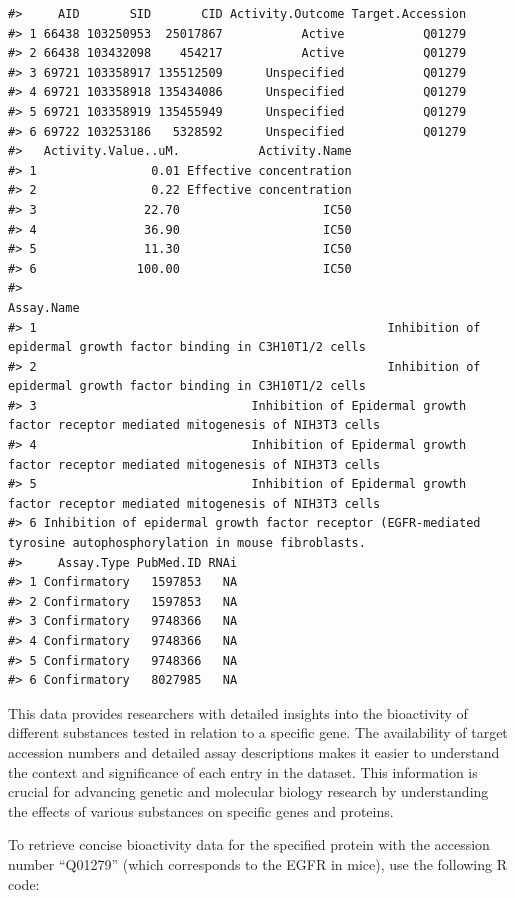 \begin{verbatim}
#>     AID       SID       CID Activity.Outcome Target.Accession
#> 1 66438 103250953  25017867           Active           Q01279
#> 2 66438 103432098    454217           Active           Q01279
#> 3 69721 103358917 135512509      Unspecified           Q01279
#> 4 69721 103358918 135434086      Unspecified           Q01279
#> 5 69721 103358919 135455949      Unspecified           Q01279
#> 6 69722 103253186   5328592      Unspecified           Q01279
#>   Activity.Value..uM.           Activity.Name
#> 1                0.01 Effective concentration
#> 2                0.22 Effective concentration
#> 3               22.70                    IC50
#> 4               36.90                    IC50
#> 5               11.30                    IC50
#> 6              100.00                    IC50
#>                                                                                                         Assay.Name
#> 1                                                 Inhibition of epidermal growth factor binding in C3H10T1/2 cells
#> 2                                                 Inhibition of epidermal growth factor binding in C3H10T1/2 cells
#> 3                              Inhibition of Epidermal growth factor receptor mediated mitogenesis of NIH3T3 cells
#> 4                              Inhibition of Epidermal growth factor receptor mediated mitogenesis of NIH3T3 cells
#> 5                              Inhibition of Epidermal growth factor receptor mediated mitogenesis of NIH3T3 cells
#> 6 Inhibition of epidermal growth factor receptor (EGFR-mediated tyrosine autophosphorylation in mouse fibroblasts.
#>     Assay.Type PubMed.ID RNAi
#> 1 Confirmatory   1597853   NA
#> 2 Confirmatory   1597853   NA
#> 3 Confirmatory   9748366   NA
#> 4 Confirmatory   9748366   NA
#> 5 Confirmatory   9748366   NA
#> 6 Confirmatory   8027985   NA
\end{verbatim}

This data provides researchers with detailed insights into the bioactivity of different substances tested in relation to a specific gene. The availability of target accession numbers and detailed assay descriptions makes it easier to understand the context and significance of each entry in the dataset. This information is crucial for advancing genetic and molecular biology research by understanding the effects of various substances on specific genes and proteins.

To retrieve concise bioactivity data for the specified protein with the accession number ``Q01279'' (which corresponds to the EGFR in mice), use the following R code:

